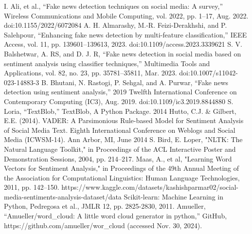 \documentclass[twocolumn,10pt]{article}
\begin{document}

\begin{thebibliography}{9}
 I. Ali, et al., “Fake news detection techniques on social media: A survey,” Wireless Communications and Mobile Computing, vol. 2022, pp. 1–17, Aug. 2022. doi:10.1155/2022/6072084
 A. H. Almarashy, M.-R. Feizi-Derakhshi, and P. Salehpour, “Enhancing fake news detection by multi-feature classification,” IEEE Access, vol. 11, pp. 139601–139613, 2023. doi:10.1109/access.2023.3339621
 S. V. Balshetwar, A. RS, and D. J. R, “Fake news detection in social media based on sentiment analysis using classifier techniques,” Multimedia Tools and Applications, vol. 82, no. 23, pp. 35781–35811, Mar. 2023. doi:10.1007/s11042-023-14883-3
 B. Bhutani, N. Rastogi, P. Sehgal, and A. Purwar, “Fake news detection using sentiment analysis,” 2019 Twelfth International Conference on Contemporary Computing (IC3), Aug. 2019. doi:10.1109/ic3.2019.8844880
 S. Loria, “TextBlob,” TextBlob, A Python Package. 2014
 Hutto, C.J. \& Gilbert, E.E. (2014). VADER: A Parsimonious Rule-based Model for Sentiment Analysis of Social Media Text. Eighth International Conference on Weblogs and Social Media (ICWSM-14). Ann Arbor, MI, June 2014
 S. Bird, E. Loper, "NLTK: The Natural Language Toolkit," in Proceedings of the ACL Interactive Poster and Demonstration Sessions, 2004, pp. 214–217.
 Maas, A., et al, "Learning Word Vectors for Sentiment Analysis," in Proceedings of the 49th Annual Meeting of the Association for Computational Linguistics: Human Language Technologies, 2011, pp. 142–150.
 https://www.kaggle.com/datasets/kashishparmar02/social-media-sentiments-analysis-dataset/data
 Scikit-learn: Machine Learning in Python, Pedregosa et al., JMLR 12, pp. 2825-2830, 2011.
 Amueller, “Amueller/word\_cloud: A little word cloud generator in python,” GitHub, https://github.com/amueller/wor\_cloud (accessed Nov. 30, 2024).
\end{thebibliography}
\end{document}
